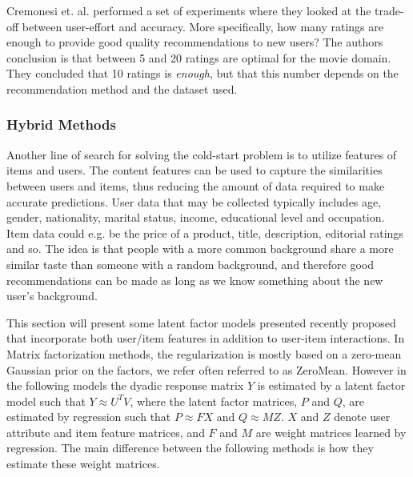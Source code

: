 Cremonesi et. al. \cite{Cremonesi2012} performed a set of experiments where
they looked at the trade-off between user-effort and accuracy. More
specifically, how many ratings are enough to provide good quality
recommendations to new users? The authors conclusion is that between 5 and 20
ratings are optimal for the movie domain. They concluded that 10
ratings is \emph{enough}, but that this number depends on the recommendation method
and the dataset used.

\subsubsection{Hybrid Methods}


Another line of search for solving the cold-start problem is to utilize features of items and users. The content features can be used to capture the similarities between users and items, thus reducing the amount of data required to make accurate predictions. User data that may be collected typically includes age, gender, nationality, marital status, income, educational level and occupation. Item data could e.g. be the price of a product, title, description, editorial ratings and so. The idea is that people with a more common background share a more similar taste than someone with a random background, and therefore good recommendations can be made as long as we know something about the new user’s background.

This section will present some latent factor models presented recently proposed that incorporate both user/item features in addition to user-item interactions. In Matrix factorization methods, the regularization is mostly based on a
zero-mean Gaussian prior on the factors, we refer often referred to as ZeroMean. However in the following models the dyadic response matrix $Y$ is estimated by a latent factor model such that $Y \approx U^{T}V$, where the latent factor matrices, $P$ and $Q$, are estimated by regression such that $P \approx FX$ and $Q \approx MZ$. $X$ and $Z$ denote user attribute and item feature matrices, and $F$ and $M$ are weight matrices learned by regression. The main difference between the following methods is how they estimate these weight matrices.


